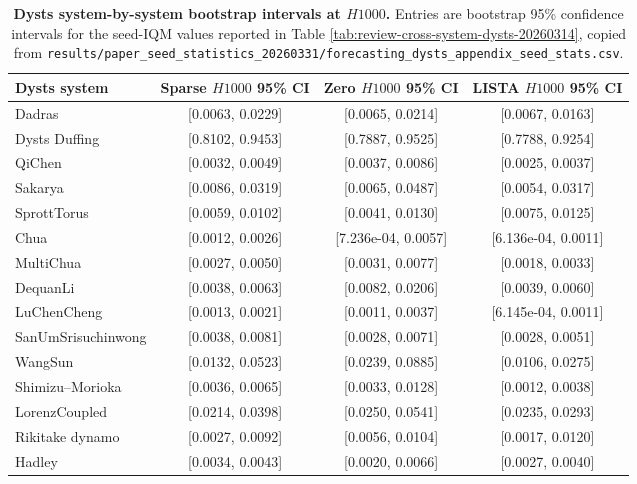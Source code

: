\begin{table}[ht]
\centering
\tiny
\setlength{\tabcolsep}{4pt}
\begin{tabular}{p{}ccc}
\toprule
Dysts system & Sparse $H1000$ 95\% CI & Zero $H1000$ 95\% CI & LISTA $H1000$ 95\% CI \\
\midrule
Dadras & [0.0063, 0.0229] & [0.0065, 0.0214] & [0.0067, 0.0163] \\
Dysts Duffing & [0.8102, 0.9453] & [0.7887, 0.9525] & [0.7788, 0.9254] \\
QiChen & [0.0032, 0.0049] & [0.0037, 0.0086] & [0.0025, 0.0037] \\
Sakarya & [0.0086, 0.0319] & [0.0065, 0.0487] & [0.0054, 0.0317] \\
SprottTorus & [0.0059, 0.0102] & [0.0041, 0.0130] & [0.0075, 0.0125] \\
Chua & [0.0012, 0.0026] & [7.236e-04, 0.0057] & [6.136e-04, 0.0011] \\
MultiChua & [0.0027, 0.0050] & [0.0031, 0.0077] & [0.0018, 0.0033] \\
DequanLi & [0.0038, 0.0063] & [0.0082, 0.0206] & [0.0039, 0.0060] \\
LuChenCheng & [0.0013, 0.0021] & [0.0011, 0.0037] & [6.145e-04, 0.0011] \\
SanUmSrisuchinwong & [0.0038, 0.0081] & [0.0028, 0.0071] & [0.0028, 0.0051] \\
WangSun & [0.0132, 0.0523] & [0.0239, 0.0885] & [0.0106, 0.0275] \\
Shimizu--Morioka & [0.0036, 0.0065] & [0.0033, 0.0128] & [0.0012, 0.0038] \\
LorenzCoupled & [0.0214, 0.0398] & [0.0250, 0.0541] & [0.0235, 0.0293] \\
Rikitake dynamo & [0.0027, 0.0092] & [0.0056, 0.0104] & [0.0017, 0.0120] \\
Hadley & [0.0034, 0.0043] & [0.0020, 0.0066] & [0.0027, 0.0040] \\
\bottomrule
\end{tabular}
\caption{\textbf{Dysts system-by-system bootstrap intervals at $H1000$.} Entries are bootstrap 95\% confidence intervals for the seed-IQM values reported in Table \ref{tab:review-cross-system-dysts-20260314}, copied from \texttt{results/paper\_seed\_statistics\_20260331/forecasting\_dysts\_appendix\_seed\_stats.csv}.}
\label{tab:review-cross-system-dysts-ci-h1000-20260314}
\end{table}

